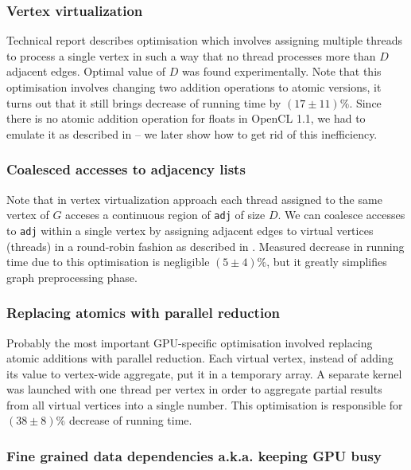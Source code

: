 \subsubsection*{Vertex virtualization}

Technical report \cite{BcGpu} describes optimisation which involves assigning multiple threads to process a single vertex in such a way that no thread processes more than $D$ adjacent edges.
Optimal value of $D$ was found experimentally.
Note that this optimisation involves changing two addition operations to atomic versions, it turns out that it still brings decrease of running time by $(17 \pm 11) \%$.
Since there is no atomic addition operation for floats in OpenCL 1.1, we had to emulate it as described in \cite{AtomAddF} -- we later show how to get rid of this inefficiency.

\subsubsection*{Coalesced accesses to adjacency lists}

Note that in vertex virtualization approach each thread assigned to the same vertex of $G$ acceses a continuous region of \verb+adj+ of size $D$.
We can coalesce accesses to \verb+adj+ within a single vertex by assigning adjacent edges to virtual vertices (threads) in a round-robin fashion as described in \cite{BcGpu}.
Measured decrease in running time due to this optimisation is negligible $(5 \pm 4) \%$, but it greatly simplifies graph preprocessing phase.

\subsubsection*{Replacing atomics with parallel reduction}

Probably the most important GPU-specific optimisation involved replacing atomic additions with parallel reduction.
Each virtual vertex, instead of adding its value to vertex-wide aggregate, put it in a temporary array.
A separate kernel was launched with one thread per vertex in order to aggregate partial results from all virtual vertices into a single number.
This optimisation is responsible for $(38 \pm 8) \%$ decrease of running time.

\subsubsection*{Fine grained data dependencies a.k.a. keeping GPU busy}

